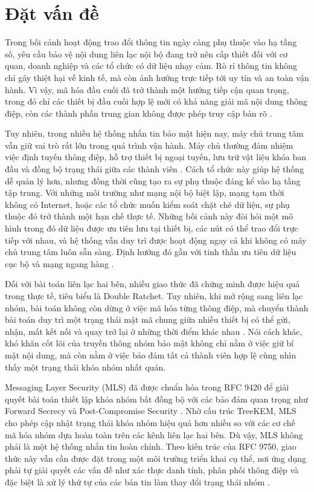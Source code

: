\documentclass[../DoAn.tex]{subfiles}
\begin{document}
\section{Đặt vấn đề}
\label{sec:dvd}

Trong bối cảnh hoạt động trao đổi thông tin ngày càng phụ thuộc vào hạ tầng số, yêu cầu bảo vệ nội dung liên lạc nội bộ đang trở nên cấp thiết đối với cơ quan, doanh nghiệp và các tổ chức có dữ liệu nhạy cảm. Rò rỉ thông tin không chỉ gây thiệt hại về kinh tế, mà còn ảnh hưởng trực tiếp tới uy tín và an toàn vận hành. Vì vậy, mã hóa đầu cuối đã trở thành một hướng tiếp cận quan trọng, trong đó chỉ các thiết bị đầu cuối hợp lệ mới có khả năng giải mã nội dung thông điệp, còn các thành phần trung gian không được phép truy cập bản rõ \cite{rfc9420,rfc9750}.

Tuy nhiên, trong nhiều hệ thống nhắn tin bảo mật hiện nay, máy chủ trung tâm vẫn giữ vai trò rất lớn trong quá trình vận hành. Máy chủ thường đảm nhiệm việc định tuyến thông điệp, hỗ trợ thiết bị ngoại tuyến, lưu trữ vật liệu khóa ban đầu và đồng bộ trạng thái giữa các thành viên \cite{rfc9750}. Cách tổ chức này giúp hệ thống dễ quản lý hơn, nhưng đồng thời cũng tạo ra sự phụ thuộc đáng kể vào hạ tầng tập trung. Với những môi trường như mạng nội bộ biệt lập, mạng tạm thời không có Internet, hoặc các tổ chức muốn kiểm soát chặt chẽ dữ liệu, sự phụ thuộc đó trở thành một hạn chế thực tế. Những bối cảnh này đòi hỏi một mô hình trong đó dữ liệu được ưu tiên lưu tại thiết bị, các nút có thể trao đổi trực tiếp với nhau, và hệ thống vẫn duy trì được hoạt động ngay cả khi không có máy chủ trung tâm luôn sẵn sàng. Định hướng đó gần với tinh thần ưu tiên dữ liệu cục bộ và mạng ngang hàng \cite{localfirst2019}.

Đối với bài toán liên lạc hai bên, nhiều giao thức đã chứng minh được hiệu quả trong thực tế, tiêu biểu là Double Ratchet. Tuy nhiên, khi mở rộng sang liên lạc nhóm, bài toán không còn dừng ở việc mã hóa từng thông điệp, mà chuyển thành bài toán duy trì một trạng thái mật mã chung giữa nhiều thiết bị có thể gửi, nhận, mất kết nối và quay trở lại ở những thời điểm khác nhau \cite{perrin2025doubleratchet,rfc9420}. Nói cách khác, khó khăn cốt lõi của truyền thông nhóm bảo mật không chỉ nằm ở việc giữ bí mật nội dung, mà còn nằm ở việc bảo đảm tất cả thành viên hợp lệ cùng nhìn thấy một trạng thái khóa nhóm nhất quán.

Messaging Layer Security (MLS) đã được chuẩn hóa trong RFC 9420 để giải quyết bài toán thiết lập khóa nhóm bất đồng bộ với các bảo đảm quan trọng như Forward Secrecy và Post-Compromise Security \cite{rfc9420}. Nhờ cấu trúc TreeKEM, MLS cho phép cập nhật trạng thái khóa nhóm hiệu quả hơn nhiều so với các cơ chế mã hóa nhóm dựa hoàn toàn trên các kênh liên lạc hai bên. Dù vậy, MLS không phải là một hệ thống nhắn tin hoàn chỉnh. Theo kiến trúc của RFC 9750, giao thức này vẫn cần được đặt trong một môi trường triển khai cụ thể, nơi ứng dụng phải tự giải quyết các vấn đề như xác thực danh tính, phân phối thông điệp và đặc biệt là xử lý thứ tự của các bản tin làm thay đổi trạng thái nhóm \cite{rfc9750}.
\end{document}
